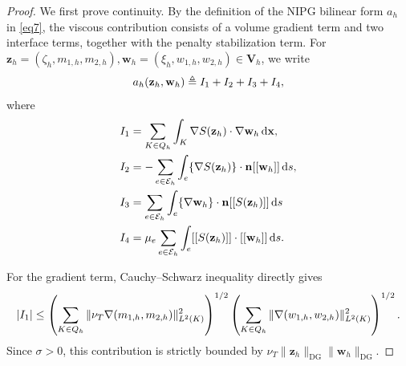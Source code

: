 \documentclass[10pt,a4paper]{amsart}
\begin{document}
\begin{proof}
We first prove continuity. By the definition of the NIPG bilinear form $a_h$ in \eqref{eq7}, the viscous contribution consists of a volume gradient term and two interface terms, together with the penalty stabilization term. For $\mathbf{z}_h=(\zeta_h,m_{1,h},m_{2,h}),\mathbf{w}_h=(\xi_{h},w_{1,h},w_{2,h}) \in \mathbf V_h$, we write
\begin{equation}\notag
\begin{aligned}
a_h(\mathbf{z}_h,\mathbf{w}_h) \triangleq
I_1+I_2+I_3+I_4,
\end{aligned}
\end{equation}
where
\begin{equation}\notag
\begin{aligned}
I_1 &= \sum_{K \in Q_h}\int_K \nabla S(\mathbf{z}_h)\cdot \nabla\mathbf{w}_h\,\mathrm{d} \mathbf{x},
\\
I_2 &= -\sum_{e \in \mathcal{E}_h}\int_{e}\{\nabla S(\mathbf{z}_h)\} \cdot \mathbf{n}[[\mathbf{w}_h]]\,\mathrm{d}s,\\
I_3 &=
 \sum_{e \in \mathcal{E}_h}\int_{e}\{\nabla\mathbf{w}_h\} \cdot \mathbf{n}[[S(\mathbf{z}_h)]]\,\mathrm{d} s \\
 I_4 &= \mu_e \sum_{e \in \mathcal{E}_h} \int_{e}[[S(\mathbf{z}_h)]] \cdot [[\mathbf{w}_h]]\,\mathrm{d}s.
\end{aligned}
\end{equation}

For the gradient term, Cauchy--Schwarz inequality directly gives
\begin{equation}\notag
|I_1|
\le
\left(
\sum_{K\in Q_h}\|\nu_T\nabla (m_{1,h},m_{2,h})\|_{L^2(K)}^2
\right)^{1/2}
\left(
\sum_{K\in Q_h}\|\nabla (w_{1,h},w_{2,h})\|_{L^2(K)}^2
\right)^{1/2}.
\end{equation}
Since $\sigma>0$, this contribution is strictly bounded by $\nu_T\|\mathbf{z}_h\|_{\mathrm{DG}}\|\mathbf{w}_h\|_{\mathrm{DG}}$.


\end{proof}
\end{document}
